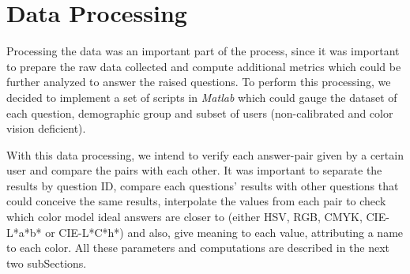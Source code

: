 \section{Data Processing}
\label{sec:results_digest}
%
Processing the data was an important part of the process, since it was important to prepare the raw data collected and compute additional metrics which could be further
analyzed to answer the raised questions. To perform this processing, we decided to implement a set of scripts in \emph{Matlab} which could gauge the dataset of each question,
demographic group and subset of users (non-calibrated and color vision deficient). \par
%
With this data processing, we intend to verify each answer-pair given by a certain user and compare the pairs with each other. It was important to separate the results by question
ID, compare each questions' results with other questions that could conceive the same results, interpolate the values from each pair to check which color model ideal answers are closer
to (either HSV, RGB, CMYK, CIE-L*a*b* or CIE-L*C*h*) and also, give meaning to each value, attributing a name to each color. All these parameters and computations are described in the next two
subSections.
%
